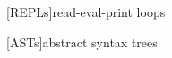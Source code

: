 \usepackage{lineno}
\linenumbers
\renewcommand\thelinenumber{\color{red}\arabic{linenumber}}

\newcommand{\Beluga}{\textsc{Beluga}\xspace}
\newcommand{\Agda}{\textsc{Agda}\xspace}
\newcommand{\Coq}{\textsc{Coq}\xspace}
\newcommand{\Lean}{\textsc{Lean}\xspace}
\newcommand{\LF}{\textsc{LF}\xspace}
\newcommand{\Twelf}{\textsc{Twelf}\xspace}
\newcommand{\Hazelnut}{\textsc{Hazelnut}\xspace}
\newcommand{\Harpoon}{\textsc{Harpoon}\xspace}

\DeclarePairedDelimiter\ceil{\lceil}{\rceil}
\DeclarePairedDelimiter\floor{\lfloor}{\rfloor}
\DeclarePairedDelimiter\angled{\langle}{\rangle}
\DeclarePairedDelimiter\ucorner{\ulcorner}{\urcorner}

[REPLs]{read-eval-print loops}

[ASTs]{abstract syntax trees}
